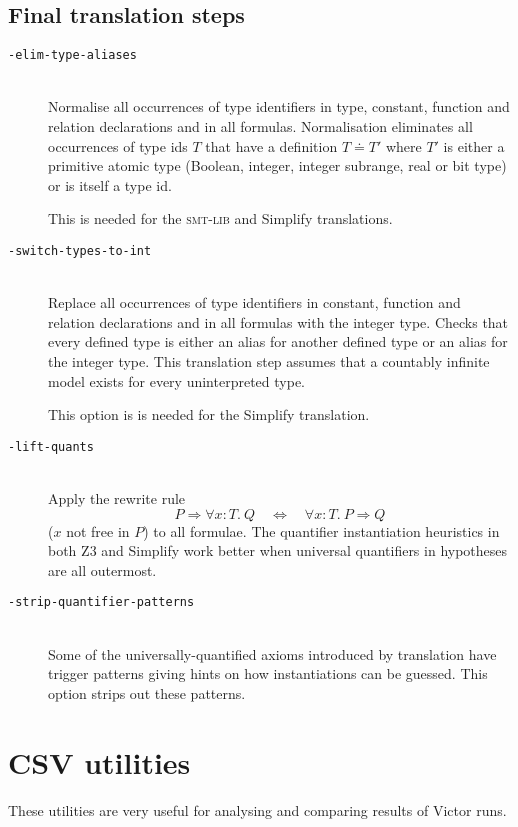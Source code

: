 \documentclass[12pt,fleqn]{article}
\newcommand{\zthree}{\textsc{Z}3}
\newcommand{\smtlib}{\textsc{smt-lib}}
\newcommand{\Iff}{\ensuremath{\Leftrightarrow}}
\newcommand{\Implies}{\ensuremath{\Rightarrow}}
\newcommand{\optionb}[1]{\item[\texttt{-{#1}}]\ \\}
\begin{document}
\subsection{Final translation steps}

\begin{description}
\optionb{elim-type-aliases}
  Normalise all occurrences of type identifiers in type,
  constant, function and relation declarations and in all formulas.
  Normalisation eliminates all occurrences of type ids $T$ that have a
  definition $T \doteq T'$ where $T'$ is either a primitive atomic
  type (Boolean, integer, integer subrange, real or bit type) or is
  itself a type id.

  This is needed for the \smtlib{} and Simplify translations.

\optionb{switch-types-to-int}
  Replace all occurrences of type identifiers in 
  constant, function and relation declarations and in all formulas with
  the integer type. 
  Checks that every defined type is either an alias for another defined
  type or an alias for the integer type. 
  This translation step assumes that a countably infinite model exists
  for every uninterpreted type. 

  This option is is needed for the Simplify translation.

  
\optionb{lift-quants}
  Apply the rewrite rule
  \[
      P \Implies \forall x:T.\ Q \quad\Iff\quad  \forall x:T.\ P \Implies Q
  \]
  ($x$ not free in $P$) 
  to all formulae.  The quantifier instantiation heuristics in both 
  \zthree{} and Simplify work better when universal quantifiers in 
  hypotheses are all outermost.

\optionb{strip-quantifier-patterns}

Some of the universally-quantified axioms introduced by translation
have trigger patterns giving hints on how instantiations can be guessed.
%
This option strips out these patterns.

\end{description}



\section{CSV utilities}
These utilities are very useful for analysing and comparing results of Victor
runs.
\end{document}
